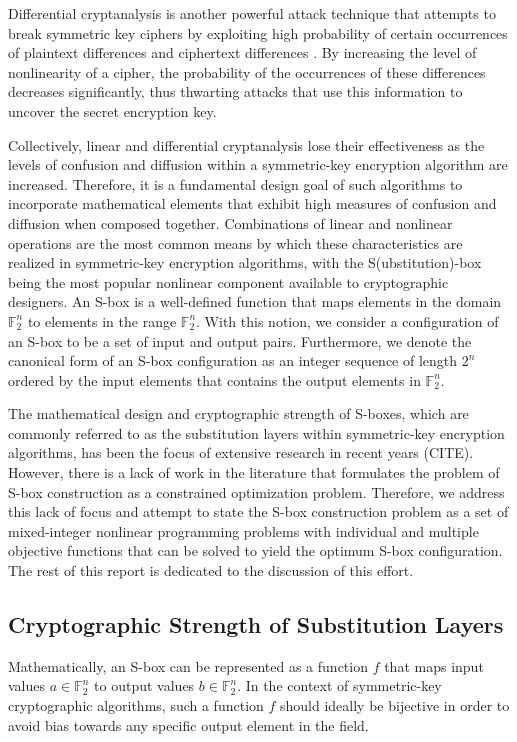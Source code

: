 \documentclass[11pt]{article}
\newcommand{\field}[1]{\mathbb{#1}} %
\begin{document}
Differential cryptanalysis is another powerful attack technique that attempts to break symmetric key ciphers by exploiting high probability of certain occurrences of plaintext differences and ciphertext differences \cite{Heys01atutorial}. By increasing the level of nonlinearity of a cipher, the probability of the occurrences of these differences decreases significantly, thus thwarting attacks that use this information to uncover the secret encryption key. 

Collectively, linear and differential cryptanalysis lose their effectiveness as the levels of confusion and diffusion within a symmetric-key encryption algorithm are increased. Therefore, it is a fundamental design goal of such algorithms to incorporate mathematical elements that exhibit high measures of confusion and diffusion when composed together. Combinations of linear and nonlinear operations are the most common means by which these characteristics are realized in symmetric-key encryption algorithms, with the S(ubstitution)-box being the most popular nonlinear component available to cryptographic designers. An S-box is a well-defined function that maps elements in the domain $\field{F}_2^n$ to elements in the range $\field{F}_2^n$. With this notion, we consider a configuration of an S-box to be a set of input and output pairs. Furthermore, we denote the canonical form of an S-box configuration as an integer sequence of length $2^n$ ordered by the input elements that contains the output elements in $\field{F}_2^n$.

The mathematical design and cryptographic strength of S-boxes, which are commonly referred to as the substitution layers within symmetric-key encryption algorithms, has been the focus of extensive research in recent years (CITE). However, there is a lack of work in the literature that formulates the problem of S-box construction as a constrained optimization problem. Therefore, we address this lack of focus and attempt to state the S-box construction problem as a set of mixed-integer nonlinear programming problems with individual and multiple objective functions that can be solved to yield the optimum S-box configuration. The rest of this report is dedicated to the discussion of this effort.

\subsection{Cryptographic Strength of Substitution Layers}
Mathematically, an S-box can be represented as a function $f$ that maps input values $a \in \field{F}_2^n$ to output values $b \in \field{F}_2^n$. In the context of symmetric-key cryptographic algorithms, such a function $f$ should ideally be bijective in order to avoid bias towards any specific output element in the field. 
\end{document}
